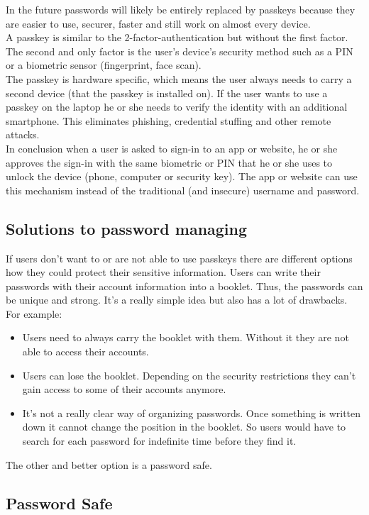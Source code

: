 \documentclass[conference]{IEEEtran}
\begin{document}
In the future passwords will likely be entirely replaced by passkeys because they are easier to use, securer, faster and still work on almost every device.\\
A passkey is similar to the 2-factor-authentication but without the first factor. The second and only factor is the user's device's security method such as a PIN or a biometric sensor (fingerprint, face scan). \\
The passkey is hardware specific, which means the user always needs to carry a second device (that the passkey is installed on). If the user wants to use a passkey on the laptop he or she needs to verify the identity with an additional smartphone. This eliminates phishing, credential stuffing and other remote attacks. \\
In conclusion when a user is asked to sign-in to an app or website, he or she approves the sign-in with the same biometric or PIN that he or she uses to unlock the device (phone, computer or security key). The app or website can use this mechanism instead of the traditional (and insecure) username and password. \cite{b5}


\subsection{Solutions to password managing}

If users don't want to or are not able to use passkeys there are different options how they could protect their sensitive information. Users can write their passwords with their account information into a booklet. Thus, the passwords can be unique and strong. It's a really simple idea but also has a lot of drawbacks.
For example:
\begin{itemize}
    \item Users need to always carry the booklet with them. Without it they are not able to access their accounts.
    \item Users can lose the booklet. Depending on the security restrictions they can't gain access to some of their accounts anymore.
    \item It's not a really clear way of organizing passwords. Once something is written down it cannot change the position in the booklet. So users would have to search for each password for indefinite time before they find it.
\end{itemize}
The other and better option is a password safe.


\subsection{Password Safe}
\end{document}

